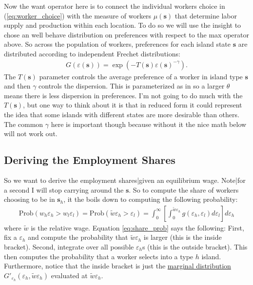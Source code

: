 \documentclass[pdftex,12pt]{article}
\begin{document}
\medskip
\noindent Now the want operator here is to connect the individual workers choice in (\ref{eq:worker_choice}) with the measure of workers $\mu(\textbf{s})$ that determine labor supply and production within each location. To do so we will use the \citet{eaton2002technology} insight to chose an well behave distribution on preferences with respect to the max operator above. So across the population of workers, preferences for each island state $\textbf{s}$ are distributed according to independent Frechet distributions:
\begin{align}
G(\varepsilon(\textbf{s})) = \exp\left(-T(\textbf{s})\varepsilon(\textbf{s})^{-\gamma}\right).
\end{align}
The $T(\textbf{s})$ parameter controls the average preference of a worker in island type $\textbf{s}$ and then $\gamma$ controls the dispersion. This is parameterized as in \citet{eaton2002technology} so a larger $\theta$ means there is less dispersion in preferences. I'm not going to do much with the $T(\textbf{s})$, but one way to think about it is that in reduced form it could represent the idea that some islands with different states are more desirable than others. The common $\gamma$ here is important though because without it the nice math below will not work out. 

\subsection{Deriving the Employment Shares}

So we want to derive the employment shares|given an equilibrium wage. Note|for a second I will stop carrying around the $\textbf{s}$. So to compute the share of workers choosing to be in $\textbf{s}_h$, it the boils down to computing the following probability:
\begin{align}
\mathrm{Prob}\left(w_h \varepsilon_h >  w_l\varepsilon_l\right) = \mathrm{Prob}\left(\tilde w \varepsilon_h > \varepsilon_l\right) = \int_0^{\infty}\left[\int_0^{\tilde w\varepsilon_h}g(\varepsilon_h,\varepsilon_l)d\varepsilon_l\right]d\varepsilon_h \label{eq:share_prob}
\end{align}
where $\tilde w$ is the relative wage. Equation \ref{eq:share_prob} says the following: First, fix a $\varepsilon_h$ and compute the probability that $\tilde w \varepsilon_h$ is larger (this is the inside bracket). Second,  integrate over all possible $\varepsilon_h$s (this is the outside bracket). This then computes the probability that a worker selects into a type $h$ island. Furthermore, notice that the inside bracket is just the \href{https://en.wikipedia.org/wiki/Marginal_distribution}{marginal distribution} $G'_{\varepsilon_h}(\varepsilon_h,\tilde w\varepsilon_h)$ evaluated at $\tilde w\varepsilon_h$.
\end{document}
